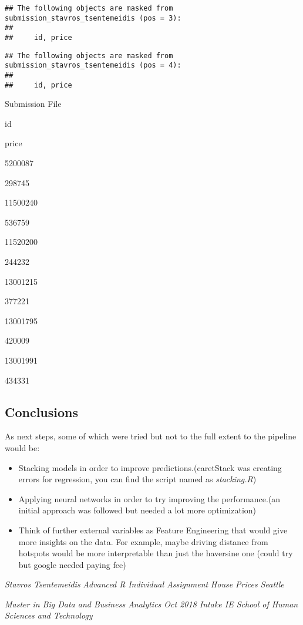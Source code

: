 \documentclass[]{article}
\providecommand{\tightlist}{%
  \setlength{\itemsep}{0pt}\setlength{\parskip}{0pt}}
\begin{document}
\begin{verbatim}
## The following objects are masked from submission_stavros_tsentemeidis (pos = 3):
## 
##     id, price
\end{verbatim}

\begin{verbatim}
## The following objects are masked from submission_stavros_tsentemeidis (pos = 4):
## 
##     id, price
\end{verbatim}

Submission File

id

price

5200087

298745

11500240

536759

11520200

244232

13001215

377221

13001795

420009

13001991

434331

\hypertarget{conclusions}{%
\subsection{Conclusions}\label{conclusions}}

As next steps, some of which were tried but not to the full extent to
the pipeline would be:

\begin{itemize}
\tightlist
\item
  Stacking models in order to improve predictions.(caretStack was
  creating errors for regression, you can find the script named as
  \emph{stacking.R})\\
\item
  Applying neural networks in order to try improving the performance.(an
  initial approach was followed but needed a lot more optimization)\\
\item
  Think of further external variables as Feature Engineering that would
  give more insights on the data. For example, maybe driving distance
  from hotspots would be more interpretable than just the haversine one
  (could try but google needed paying fee)
\end{itemize}

\emph{Stavros Tsentemeidis} \textbar{} \emph{Advanced R} \textbar{}
\emph{Individual Assignment} \textbar{} \emph{House Prices Seattle}

\emph{Master in Big Data and Business Analytics \textbar{} Oct 2018
Intake \textbar{} IE School of Human Sciences and Technology}
\end{document}

